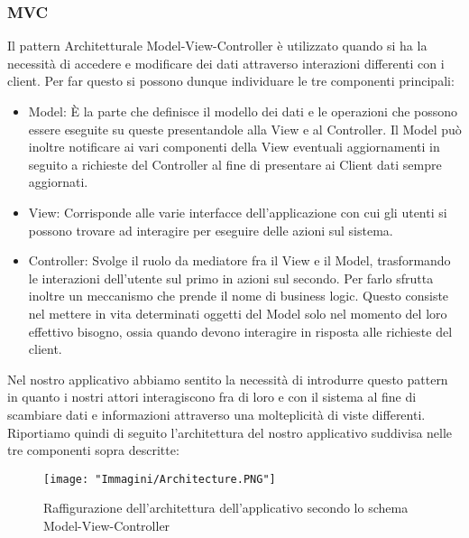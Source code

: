 \documentclass{article}
\begin{document}
\subsubsection{MVC}

Il pattern Architetturale Model-View-Controller \`e utilizzato quando si ha la necessit\`a di accedere e modificare dei dati attraverso interazioni differenti con i client. Per far questo si possono dunque individuare le tre componenti principali:

\begin{itemize}
\item Model: \`E la parte che definisce il modello dei dati e le operazioni che possono essere  eseguite su queste presentandole alla View e al Controller. Il Model pu\`o inoltre notificare ai vari componenti della View eventuali aggiornamenti in seguito a richieste del Controller al fine di presentare ai Client dati sempre aggiornati.

\item View: Corrisponde alle varie interfacce dell'applicazione con cui gli utenti si possono trovare ad interagire per eseguire delle azioni sul sistema.
 
\item Controller: Svolge il ruolo da mediatore fra il View e il Model, trasformando le interazioni dell'utente sul primo in azioni sul secondo. Per farlo sfrutta inoltre un meccanismo che prende il nome di business logic. Questo consiste nel mettere in vita determinati oggetti del Model solo nel momento del loro effettivo bisogno, ossia quando devono interagire in risposta alle richieste del client.
\end{itemize}

\newpage

\noindent Nel nostro applicativo abbiamo sentito la necessit\`a di introdurre questo pattern in quanto i nostri attori interagiscono fra di loro e con il sistema al fine di scambiare dati e informazioni attraverso una molteplicit\`a di viste differenti. \\
Riportiamo quindi di seguito l'architettura del nostro applicativo suddivisa nelle tre componenti sopra descritte:

\begin{figure}[!h]
\centering
\texttt{[image: "Immagini/Architecture.PNG"]}
\caption{Raffigurazione dell'architettura dell'applicativo secondo lo schema Model-View-Controller}
\end{figure}

\newpage
\end{document}
